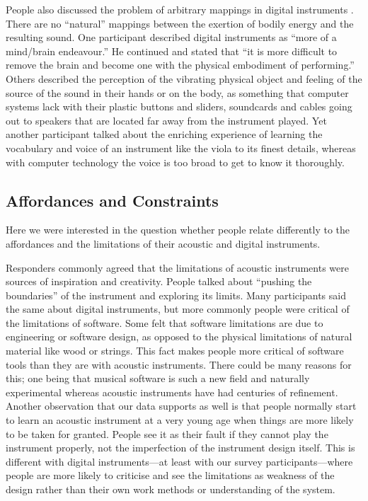 People also discussed the problem of arbitrary mappings in digital
instruments \cite{Hunt:2002}. There are no ``natural'' mappings between the exertion of bodily
energy and the resulting sound. One participant described digital instruments as
``more of a mind/brain endeavour.'' He continued and stated that ``it is more
difficult to remove the brain and become one with the physical embodiment of
performing.'' Others described the perception of the vibrating physical object
and feeling of the source of the sound in their hands or on the body, as
something that computer systems lack with their plastic buttons and sliders,
soundcards and cables going out to speakers that are located far away from the
instrument played. Yet another participant talked about the enriching experience
of learning the vocabulary and voice of an instrument like the viola to its
finest details, whereas with computer technology the voice is too broad to get to
know it thoroughly.

\subsection{Affordances and Constraints}
Here we were interested in the question whether people relate differently to the
affordances and the limitations of their acoustic and digital instruments.

Responders commonly agreed that the limitations of acoustic instruments were sources of inspiration and creativity. People talked about ``pushing the boundaries'' of the instrument and exploring its limits. Many participants said the same about digital instruments, but more commonly people were critical of the limitations of software. Some felt that software limitations are due to engineering or software design, as opposed to the physical limitations of natural material like wood or strings. This fact makes people more critical of software tools than they are with acoustic instruments. There could be many reasons for this; one being that musical software is such a new field and naturally experimental whereas acoustic instruments have had centuries of refinement. Another observation that our data supports as well is that people normally start to learn an acoustic instrument at a very young age when things are more likely to be taken for granted. People see it as their fault if they cannot play the instrument properly, not the imperfection of the instrument design itself. This is different with digital instruments---at least with our survey participants---where people are more likely to criticise and see the limitations as weakness of the design rather than their own work methods or understanding of the system.

